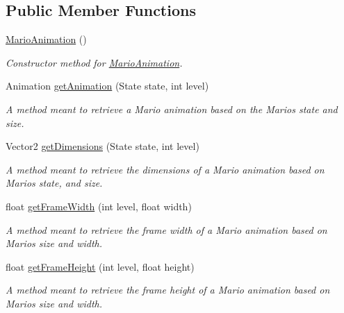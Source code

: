 \subsection*{Public Member Functions}
\begin{DoxyCompactItemize}
\item 
\hyperlink{classnl_1_1arjanfrans_1_1mario_1_1graphics_1_1MarioAnimation_a15feb12f385241d47dfc71e2c90a8d06}{Mario\+Animation} ()
\begin{DoxyCompactList}\small\item\em Constructor method for \hyperlink{classnl_1_1arjanfrans_1_1mario_1_1graphics_1_1MarioAnimation}{Mario\+Animation}. \end{DoxyCompactList}\item 
Animation \hyperlink{classnl_1_1arjanfrans_1_1mario_1_1graphics_1_1MarioAnimation_a74455148020682d19d02372d17abd08f}{get\+Animation} (State state, int level)
\begin{DoxyCompactList}\small\item\em A method meant to retrieve a Mario animation based on the Mario\textquotesingle{}s state and size. \end{DoxyCompactList}\item 
Vector2 \hyperlink{classnl_1_1arjanfrans_1_1mario_1_1graphics_1_1MarioAnimation_aa4b74896a7eea77ece64354a3426b7c7}{get\+Dimensions} (State state, int level)
\begin{DoxyCompactList}\small\item\em A method meant to retrieve the dimensions of a Mario animation based on Mario\textquotesingle{}s state, and size. \end{DoxyCompactList}\item 
float \hyperlink{classnl_1_1arjanfrans_1_1mario_1_1graphics_1_1MarioAnimation_a8f05347b79edd167309067ed7d3c2794}{get\+Frame\+Width} (int level, float width)
\begin{DoxyCompactList}\small\item\em A method meant to retrieve the frame width of a Mario animation based on Mario\textquotesingle{}s size and width. \end{DoxyCompactList}\item 
float \hyperlink{classnl_1_1arjanfrans_1_1mario_1_1graphics_1_1MarioAnimation_ab0abed641099c07a993255f63b2f59b9}{get\+Frame\+Height} (int level, float height)
\begin{DoxyCompactList}\small\item\em A method meant to retrieve the frame height of a Mario animation based on Mario\textquotesingle{}s size and width. \end{DoxyCompactList}\end{DoxyCompactItemize}
